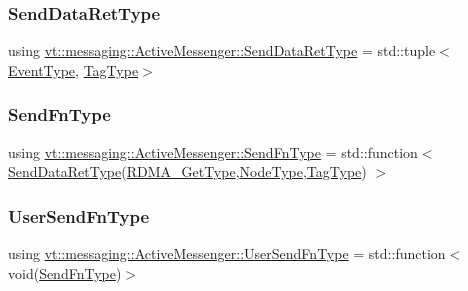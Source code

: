 \subsubsection{\texorpdfstring{Send\+Data\+Ret\+Type}{SendDataRetType}}
{\footnotesize\ttfamily using \hyperlink{structvt_1_1messaging_1_1_active_messenger_a839987e944b6b9c681bc56efbea1f220}{vt\+::messaging\+::\+Active\+Messenger\+::\+Send\+Data\+Ret\+Type} =  std\+::tuple$<$\hyperlink{namespacevt_a009267401def7ae8bf201892222d060f}{Event\+Type}, \hyperlink{namespacevt_a84ab281dae04a52a4b243d6bf62d0e52}{Tag\+Type}$>$}

\mbox{\label{structvt_1_1messaging_1_1_active_messenger_a9821bc2d924729107f08fadf5a217537}} 
\subsubsection{\texorpdfstring{Send\+Fn\+Type}{SendFnType}}
{\footnotesize\ttfamily using \hyperlink{structvt_1_1messaging_1_1_active_messenger_a9821bc2d924729107f08fadf5a217537}{vt\+::messaging\+::\+Active\+Messenger\+::\+Send\+Fn\+Type} =  std\+::function$<$ \hyperlink{structvt_1_1messaging_1_1_active_messenger_a839987e944b6b9c681bc56efbea1f220}{Send\+Data\+Ret\+Type}(\hyperlink{namespacevt_a1cab7f4860f65a49ad2c042d6240f288}{R\+D\+M\+A\+\_\+\+Get\+Type},\hyperlink{namespacevt_a866da9d0efc19c0a1ce79e9e492f47e2}{Node\+Type},\hyperlink{namespacevt_a84ab281dae04a52a4b243d6bf62d0e52}{Tag\+Type}) $>$}

\mbox{\label{structvt_1_1messaging_1_1_active_messenger_a4b1993ad77436b6ed6c7fd32801c50ed}} 
\subsubsection{\texorpdfstring{User\+Send\+Fn\+Type}{UserSendFnType}}
{\footnotesize\ttfamily using \hyperlink{structvt_1_1messaging_1_1_active_messenger_a4b1993ad77436b6ed6c7fd32801c50ed}{vt\+::messaging\+::\+Active\+Messenger\+::\+User\+Send\+Fn\+Type} =  std\+::function$<$void(\hyperlink{structvt_1_1messaging_1_1_active_messenger_a9821bc2d924729107f08fadf5a217537}{Send\+Fn\+Type})$>$}




